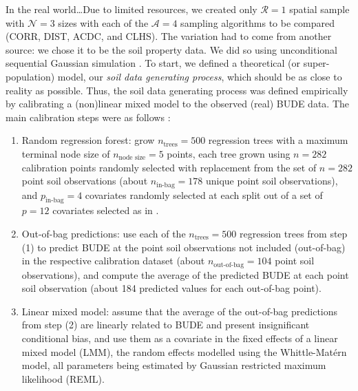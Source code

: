 In the real world\dots Due to limited resources, we created only $\mathcal{R} = 1$ spatial 
sample with $\mathcal{N} = 3$ sizes with each of the $\mathcal{A} = 4$ sampling algorithms to be 
compared (CORR, DIST, ACDC, and CLHS). The variation had to come from another source: we chose it to be the 
soil property data. We did so using unconditional sequential Gaussian simulation \cite{Goovaerts2001, 
Pebesma2004}. To start, we defined a theoretical (or super-population) model, our \emph{soil data generating 
process}, which should be as close to reality as possible. Thus, the soil data generating process was defined 
empirically by 
calibrating a (non)linear mixed model to the observed (real) BUDE data. The main calibration steps were as 
follows \cite{Breiman2001, LiawEtAl2002, DiggleEtAl2007, Lark2012}:

\begin{enumerate}
 \item Random regression forest: grow $n_{\text{trees}} = 500$ regression trees with a maximum terminal node 
 size of $n_{\text{node size}} = 5$ points, each tree grown using $n = 282$ calibration points randomly 
 selected with replacement from the set of $n = 282$ point soil observations (about $n_{\text{in-bag}} = 178$ 
 unique point soil observations), and $p_{\text{in-bag}} = 4$ covariates randomly selected at each split out 
 of a set of $p = 12$ covariates selected as in \citet{Samuel-RosaEtAl2015}.
 
 \item Out-of-bag predictions: use each of the $n_{\text{trees}} = 500$ regression trees from step (1) to 
 predict BUDE at the point soil observations not included (out-of-bag) in the respective calibration dataset 
 (about $n_{\text{out-of-bag}} = 104$ point soil observations), and compute the average of the predicted BUDE 
 at each point soil observation (about 184 predicted values for each out-of-bag point).
 
 \item Linear mixed model: assume that the average of the out-of-bag predictions from step (2) are linearly 
 related to BUDE and present insignificant conditional bias, and use them as a covariate in the fixed effects 
 of a linear mixed model (LMM), the random effects modelled using the Whittle-Matérn model, all parameters 
 being estimated by Gaussian restricted maximum likelihood (REML).
\end{enumerate}


